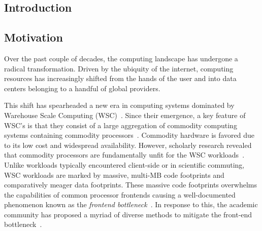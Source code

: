 \documentclass[../main.tex]{subfiles}
\begin{document}
\ifx\chapincluded\undefined
  \begin{refsection}
 \fi


\chapter{Introduction}
\label{chap:intro}

\section{Motivation}

Over the past couple of decades, the computing landscape has undergone a radical transformation. Driven by the ubiquity of the internet, computing resources has increasingly shifted from the hands of the user and into data centers belonging to a handful of global providers.


This shift has spearheaded a new era in computing systems dominated by Warehouse Scale Computing (WSC)~\cite{barroso18_datac_as_comput}. Since their emergence, a key feature of WSC's is that they consist of a large aggregation of commodity computing systems containing commodity processors~\cite{barroso03_web_searc_planet}. Commodity hardware is favored due to its low cost and widespread availability. However, scholarly research revealed that commodity processors are fundamentally unfit for the WSC workloads~\cite{ferdman12_clear_cloud,kanev15_profil}. Unlike workloads typically encountered client-side or in scientific commuting, WSC workloads are marked by massive, multi-MB code footprints and comparatively meager data footprints. These massive code footprints overwhelms the capabilities of common processor frontends causing a well-documented phenomenon known as the \emph{frontend bottleneck}~\cite{ailamaki99_dbmss_moder_proces,keeton98_perfor_charac_quad_pentium_pro,ranganathan98_perfor_datab_workl_shared_memor}.  In response to this, the academic community has proposed a myriad of diverse methods to mitigate the front-end bottleneck~\cite{reinman99_fetch_direc_instr_prefet, kumar17_boomer,kumar18_blast_throug_front_end_bottl_with_shotg,kumar20_shoot_down_server_front_end_bottl,ferdman08_tempor,ferdman11_proac_instr_fetch,kaynak13_shift,kaynak15_confl,ayers19_asmdb,ajorpaz18_explor_predic_replac_polic_instr,khan20_i_spy,soundararajan21_pdede,ansari20_divid,khan21_rippl,}. 



\end{refsection}
\end{document}
